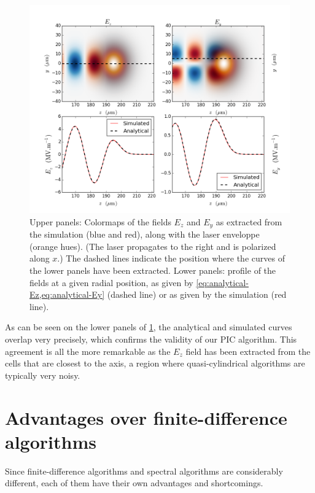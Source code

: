 \documentclass[1p,times,authoryear]{elsarticle}
\begin{document}
\begin{figure}[!h]
\centering
\includegraphics[width=\textwidth]{figures/Linear_wkfld.png}
\caption{\label{fig:Linear_wkfld}Upper panels: Colormaps of the fields $E_z$ and
  $E_y$ as extracted from the simulation (blue and red), along with
  the laser enveloppe (orange hues). (The laser propagates to the
  right and is polarized along $x$.) The dashed lines indicate the
  position where the curves of the lower panels have been extracted. 
Lower panels: profile of the fields at a given radial
position, as given by \cref{eq:analytical-Ez,eq:analytical-Ey} (dashed
line) or as given by the simulation (red line).}
\end{figure}

As can be seen on the lower panels of \cref{fig:Linear_wkfld}, the
analytical and simulated curves overlap very precisely, which confirms
the validity of our PIC algorithm. This agreement is all
the more remarkable as the $E_z$ field has been extracted from the cells
that are closest to the axis, a region where quasi-cylindrical algorithms
are typically very noisy.

\section{Advantages over finite-difference algorithms}
\label{sec:advantages}

Since finite-difference algorithms and spectral algorithms are
considerably different, each of them have their own advantages and
shortcomings. 
\end{document}
